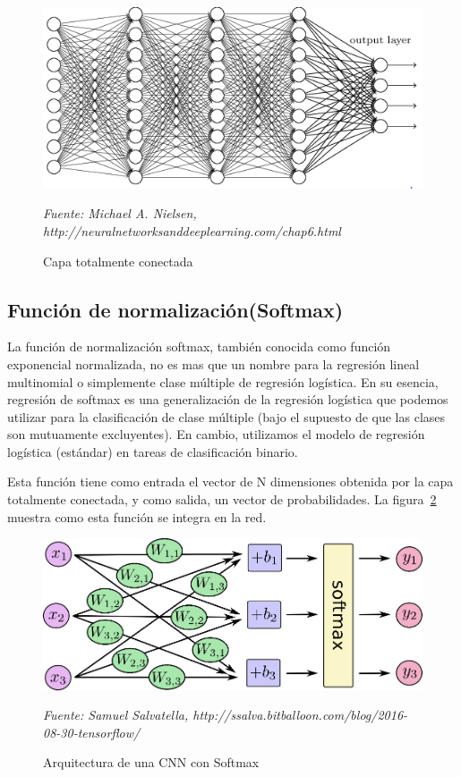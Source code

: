 \begin{figure}[H]
		\centering
		\includegraphics[width=120mm]{Imagenes/grafico_full_conect.png}
		\caption{Capa totalmente conectada}
		\vspace{0.15cm}
		\textit{Fuente: Michael A. Nielsen, http://neuralnetworksanddeeplearning.com/chap6.html}
		\label{fig:grafico_full_conect}
\end{figure}

\subsection{Función de normalización(Softmax)}
\label{sub:softmax}
La función de normalización softmax, también conocida como función exponencial normalizada, no es mas que un nombre para la regresión lineal multinomial o simplemente clase múltiple de regresión logística. En su esencia, regresión de softmax es una generalización de la regresión logística que podemos utilizar para la clasificación de clase múltiple (bajo el supuesto de que las clases son mutuamente excluyentes). En cambio, utilizamos el modelo de regresión logística (estándar) en tareas de clasificación binario. 

Esta función tiene como entrada el vector de N dimensiones obtenida por la capa totalmente conectada, y como salida, un vector de probabilidades. La figura~\ref{fig:arquitectura_cnn_softmax} muestra como esta función se integra en la red. 

\begin{figure}[H]
		\centering
		\includegraphics[width=120mm]{Imagenes/arquitectura_cnn_softmax.png}
		\caption{Arquitectura de una CNN con Softmax}
		\vspace{0.15cm}
		\textit{Fuente: Samuel Salvatella, http://ssalva.bitballoon.com/blog/2016-08-30-tensorflow/}
		\label{fig:arquitectura_cnn_softmax}
\end{figure}


